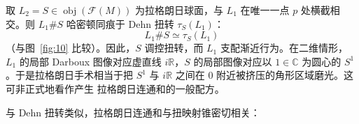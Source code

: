 \begin{Rem}\label{rem:6.27}
取 $L_2=S\in\operatorname{obj}(\mathcal F(M))$ 为拉格朗日球面，与 $L_1$
在唯一一点 $p$ 处横截相交。则 $L_1\#S$ 哈密顿同痕于 Dehn 扭转
$\tau_S(L_1)$：
\begin{equation}
L_1\#S\simeq\tau_S(L_1)
\label{eq:6.95}
\end{equation}
（与图~\ref{fig:10} 比较）。因此，$S$ 调控扭转，而 $L_1$ 支配渐近行为。在二维情形，
$L_1$ 的局部 Darboux 图像对应虚直线 $i\mathbb R$，$S$ 的局部图像对应以
$1\in\mathbb C$ 为圆心的 $S^1$。于是拉格朗日手术相当于把 $S^1$ 与
$i\mathbb R$ 之间在 $0$ 附近被挤压的角形区域磨光。这可非正式地看作产生
拉格朗日连通和的一般配方。
\end{Rem}


与 Dehn 扭转类似，拉格朗日连通和与扭映射锥密切相关：

